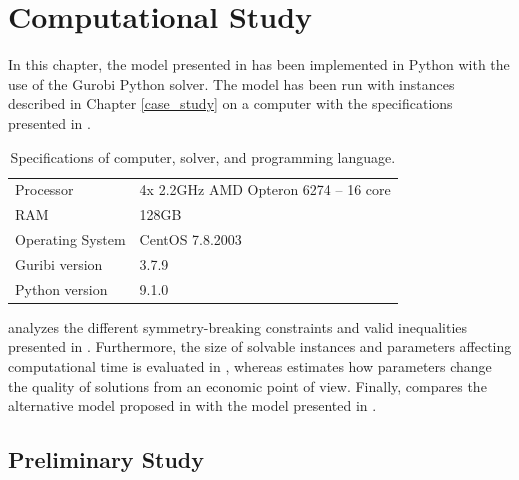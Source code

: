 \chapter{Computational Study}\label{comp_study}
In this chapter, the model presented in  has been implemented in Python with the use of
the Gurobi Python solver.  The model has been run with instances described in Chapter \ref{case_study} on a computer with the specifications presented in .
\\
\begin{table}[H]
    \centering
    \caption{Specifications of computer, solver, and programming language.}
    \begin{tabular}{l| l}
        Processor & 4x 2.2GHz AMD Opteron 6274 – 16 core\\
        RAM & 128GB \\
        Operating System & CentOS 7.8.2003 \\
        Guribi version & 3.7.9\\
        Python version & 9.1.0\\
    \end{tabular}
    \label{comp_study_specs}
\end{table}

 analyzes the different symmetry-breaking constraints and valid inequalities presented in . Furthermore, the size of solvable instances and parameters affecting computational time is evaluated in , whereas  estimates how parameters
change the quality of solutions from an economic point of view. Finally,  compares the alternative model proposed in  with the model presented in .


\section{Preliminary Study}\label{prelim_study}

